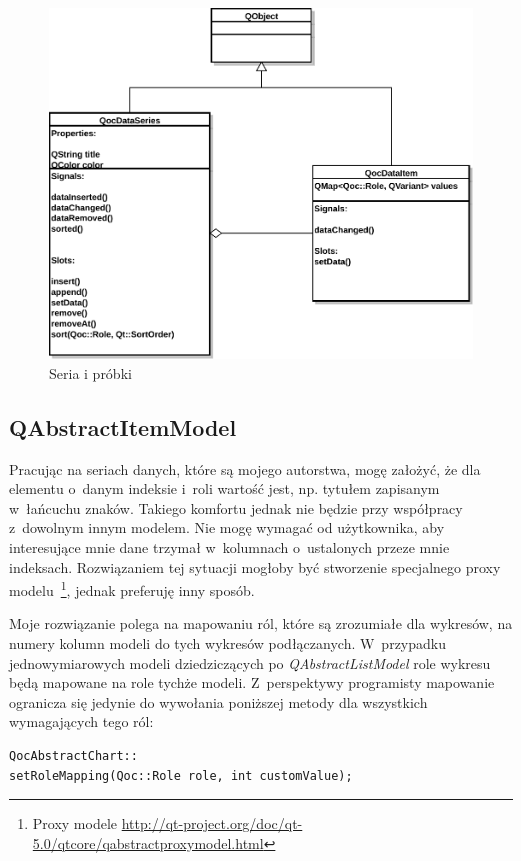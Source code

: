 \begin{figure}[H]
\centering
\includegraphics[scale=0.8]{img/seria_danych.pdf}
\caption{Seria i próbki}\label{rys:seria}
\end{figure}

\subsection{QAbstractItemModel}
Pracując na seriach danych, które są mojego autorstwa, mogę założyć, że dla elementu o~danym indeksie i~roli wartość jest, np. tytułem zapisanym w~łańcuchu znaków. Takiego komfortu jednak nie będzie przy współpracy z~dowolnym innym modelem. Nie mogę wymagać od użytkownika, aby interesujące mnie dane trzymał w~kolumnach o~ustalonych przeze mnie indeksach. Rozwiązaniem tej sytuacji mogłoby być stworzenie specjalnego proxy modelu~\footnote{Proxy modele \url{http://qt-project.org/doc/qt-5.0/qtcore/qabstractproxymodel.html}}, jednak preferuję inny sposób.

Moje rozwiązanie polega na mapowaniu ról, które są zrozumiałe dla wykresów, na numery kolumn modeli do tych wykresów podłączanych. W~przypadku jednowymiarowych modeli dziedziczących po \textit{QAbstractListModel} role wykresu będą mapowane na role tychże modeli. Z~perspektywy programisty mapowanie ogranicza się jedynie do wywołania poniższej metody dla wszystkich wymagających tego ról:

\begin{lstlisting}
QocAbstractChart::
setRoleMapping(Qoc::Role role, int customValue);
\end{lstlisting}

